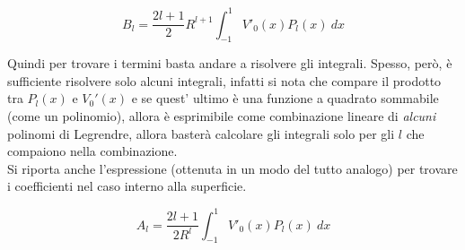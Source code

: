 \begin{tcolorbox}[colback=yellow!10!white, colframe=orange!70!black, boxrule=0.8pt]
\begin{equation*}
    B_l = \frac{2l +1}{2} R^{l+1} \int_{-1} ^{1} V'_0(x) P_{l} (x) \ d x
\end{equation*}
\end{tcolorbox}

\newpage

Quindi per trovare i termini basta andare a risolvere gli integrali. Spesso, però, è sufficiente risolvere solo alcuni integrali, infatti si nota che compare il prodotto tra $P_l(x)$ e $V_0 ' (x)$ e se quest' ultimo è una funzione a quadrato sommabile (come un polinomio), allora è esprimibile come combinazione lineare di \emph{alcuni} polinomi di Legrendre, allora basterà calcolare gli integrali solo per gli $l$ che compaiono nella combinazione. \\

Si riporta anche l'espressione (ottenuta in un modo del tutto analogo)
per trovare i coefficienti nel caso interno alla superficie.

\begin{tcolorbox}[colback=yellow!10!white, colframe=orange!70!black, boxrule=0.8pt]
\begin{equation}
    A_l = \frac{2l +1}{2 R^l}  \int_{-1} ^{1} V'_0(x) P_{l} (x) \ d x
\end{equation}
\end{tcolorbox}
